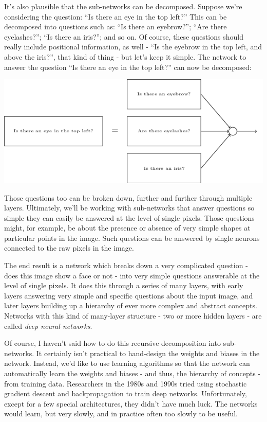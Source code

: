 It's also plausible that the sub-networks can be decomposed. Suppose we're considering the question: ``Is there an eye in the top left?'' This can be decomposed into questions such as: ``Is there an eyebrow?''; ``Are there eyelashes?''; ``Is there an iris?''; and so on. Of course, these questions should really include positional information, as well - ``Is the eyebrow in the top left, and above the iris?'', that kind of thing - but let's keep it simple. The network to answer the question ``Is there an eye in the top left?'' can now be decomposed:

{\centering
\includegraphics[width=\textwidth,]{pic/tikz15.png}
\par}

Those questions too can be broken down, further and further through multiple layers. Ultimately, we'll be working with sub-networks that answer questions so simple they can easily be answered at the level of single pixels. Those questions might, for example, be about the presence or absence of very simple shapes at particular points in the image. Such questions can be answered by single neurons connected to the raw pixels in the image.

The end result is a network which breaks down a very complicated question - does this image show a face or not - into very simple questions answerable at the level of single pixels. It does this through a series of many layers, with early layers answering very simple and specific questions about the input image, and later layers building up a hierarchy of ever more complex and abstract concepts. Networks with this kind of many-layer structure - two or more hidden layers - are called \textit{deep neural networks}.

Of course, I haven't said how to do this recursive decomposition into sub-networks. It certainly isn't practical to hand-design the weights and biases in the network. Instead, we'd like to use learning algorithms so that the network can automatically learn the weights and biases - and thus, the hierarchy of concepts - from training data. Researchers in the 1980s and 1990s tried using stochastic gradient descent and backpropagation to train deep networks. Unfortunately, except for a few special architectures, they didn't have much luck. The networks would learn, but very slowly, and in practice often too slowly to be useful.

